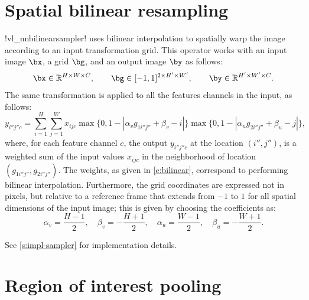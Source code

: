 \section{Spatial bilinear resampling}\label{s:spatial-sampler}

!vl_nnbilinearsampler! uses bilinear interpolation to spatially warp the image according to an input transformation grid. This operator works with an input image $\bx$, a grid $\bg$, and an output image $\by$ as follows:
\[
  \bx \in \mathbb{R}^{H \times W \times C},
  \qquad
  \bg \in [-1,1]^{2 \times H' \times W'},
  \qquad
  \by \in \mathbb{R}^{H' \times W' \times C}.
\]
The same transformation is applied to all the features channels in the input, as follows:
\begin{equation}\label{e:bilinear}
  y_{i''j''c}
  =
  \sum_{i=1}^H
  \sum_{j=1}^W
  x_{ijc}
  \max\{0, 1-|\alpha_v g_{1i''j''} + \beta_v - i|\}
  \max\{0, 1-|\alpha_u g_{2i''j''} + \beta_u - j|\},
\end{equation}
where, for each feature channel $c$, the output $y_{i''j''c}$ at the location $(i'',j'')$, is a weighted sum of the input values $x_{ijc}$ in the neighborhood of location $(g_{1i''j''},g_{2i''j''})$. The weights, as given in \eqref{e:bilinear}, correspond to performing bilinear interpolation. Furthermore, the grid coordinates are expressed not in pixels, but relative to a reference frame that extends from $-1$ to $1$ for all spatial dimensions of the input image; this is given by choosing the coefficients as:
\[
\alpha_v = \frac{H-1}{2},\quad
\beta_v = -\frac{H+1}{2},\quad
\alpha_u = \frac{W-1}{2},\quad
\beta_u = -\frac{W+1}{2}.
\]

See \cref{s:impl-sampler} for implementation details.

\section{Region of interest pooling}\label{s:roi-pooling}

